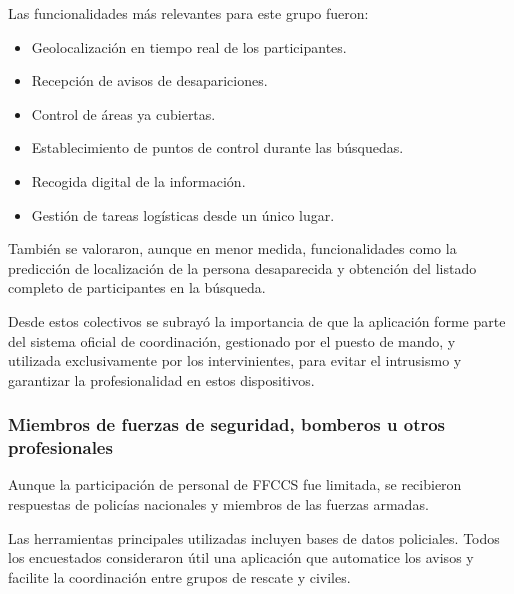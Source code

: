 

\vspace{7cm}

Las funcionalidades más relevantes para este grupo fueron:
\begin{itemize}
	\item Geolocalización en tiempo real de los participantes.
	\item Recepción de avisos de desapariciones.
	\item Control de áreas ya cubiertas.
	\item Establecimiento de puntos de control durante las búsquedas.
	\item Recogida digital de la información.
	\item Gestión de tareas logísticas desde un único lugar.
\end{itemize}

También se valoraron, aunque en menor medida, funcionalidades como la predicción de localización de la persona desaparecida y obtención del listado completo de participantes en la búsqueda.


Desde estos colectivos se subrayó la importancia de que la aplicación forme parte del sistema oficial de coordinación, gestionado por el puesto de mando, y utilizada exclusivamente por los intervinientes, para evitar el intrusismo y garantizar la profesionalidad en estos dispositivos.


\subsubsection{Miembros de fuerzas de seguridad, bomberos u otros profesionales}

Aunque la participación de personal de FFCCS fue limitada, se recibieron respuestas de policías nacionales y miembros de las fuerzas armadas.

Las herramientas principales utilizadas incluyen bases de datos policiales. Todos los encuestados consideraron útil una aplicación que automatice los avisos y facilite la coordinación entre grupos de rescate y civiles.

